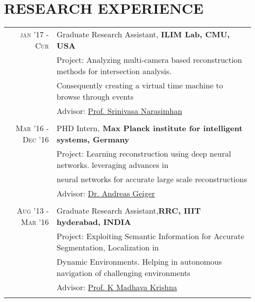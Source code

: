 \documentclass[a4paper,10pt]{article}
\begin{document}
\vspace{-4 mm}

\section{RESEARCH EXPERIENCE} 
\begin{tabular}{rl}	
 \textsc{jan '17 - Cur} &  Graduate Research Assistant, \bf{ILIM Lab, CMU, USA}\\
 & Project: Analyzing multi-camera based reconstruction methods for intersection analysis. \\ & Consequently creating a virtual time machine to browse through events\\
 & \small Advisor: \href{http://www.cs.cmu.edu/~srinivas/} {Prof. Srinivasa Narasimhan} \\
 
 \vspace{-2 mm}
&\\

 \textsc{Mar '16 - Dec '16} &  PHD Intern,\bf{ Max Planck institute for intelligent systems, Germany}\\
& Project: Learning reconstruction using deep neural networks. leveraging advances in \\  
& neural networks for accurate large scale reconstructions\\
&\small Advisor: \href{http://www.cvlibs.net/} {Dr. Andreas Geiger} \\

 \vspace{-2 mm}
&\\

 \textsc{Aug '13 - Mar '16} &  Graduate Research Assistant,\bf{RRC, IIIT hyderabad, INDIA}\\
 & Project: Exploiting Semantic Information for Accurate Segmentation, Localization in \\ & Dynamic Environments. Helping in autonomous navigation of challenging environments\\
 &\normalsize  \small Advisor: \href{https://www.iiit.ac.in/people/faculty/mkrishna/} {Prof. K Madhava Krishna} \\
 
  \vspace{-2 mm}
&\\



\end{tabular}
\end{document}
